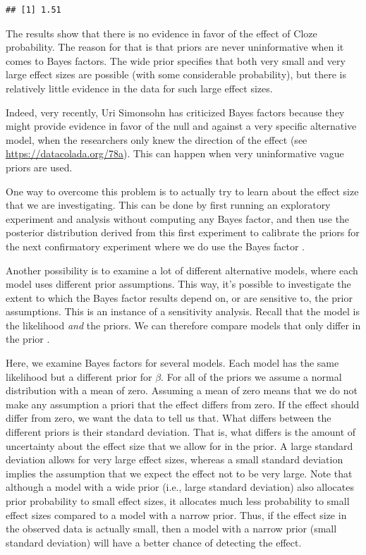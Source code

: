 \documentclass[12pt,]{krantz}
\theoremstyle{definition}
\theoremstyle{definition}
\theoremstyle{definition}
\theoremstyle{remark}
\begin{document}
\begin{verbatim}
## [1] 1.51
\end{verbatim}

The results show that there is no evidence in favor of the effect of Cloze probability. The reason for that is that priors are never uninformative when it comes to Bayes factors. The wide prior specifies that both very small and very large effect sizes are possible (with some considerable probability), but there is relatively little evidence in the data for such large effect sizes.

Indeed, very recently, Uri Simonsohn has criticized Bayes factors because they might provide evidence in favor of the null and against a very specific alternative model, when the researchers only knew the direction of the effect (see \url{https://datacolada.org/78a}). This can happen when very uninformative vague priors are used.

One way to overcome this problem is to actually try to learn about the effect size that we are investigating. This can be done by first running an exploratory experiment and analysis without computing any Bayes factor, and then use the posterior distribution derived from this first experiment to calibrate the priors for the next confirmatory experiment where we do use the Bayes factor \citep[see][ for a Bayes Factor test calibrated to investigate replication success]{verhagenBayesianTestsQuantify2014}.

Another possibility is to examine a lot of different alternative models, where each model uses different prior assumptions. This way, it's possible to investigate the extent to which the Bayes factor results depend on, or are sensitive to, the prior assumptions. This is an instance of a sensitivity analysis. Recall that the model is the likelihood \emph{and} the priors. We can therefore compare models that only differ in the prior \citep[for an example involving EEG and predictability effects, see][]{nicenboim2020words}.

Here, we examine Bayes factors for several models. Each model has the same likelihood but a different prior for \(\beta\). For all of the priors we assume a normal distribution with a mean of zero. Assuming a mean of zero means that we do not make any assumption a priori that the effect differs from zero. If the effect should differ from zero, we want the data to tell us that. What differs between the different priors is their standard deviation. That is, what differs is the amount of uncertainty about the effect size that we allow for in the prior. A large standard deviation allows for very large effect sizes, whereas a small standard deviation implies the assumption that we expect the effect not to be very large. Note that although a model with a wide prior (i.e., large standard deviation) also allocates prior probability to small effect sizes, it allocates much less probability to small effect sizes compared to a model with a narrow prior. Thus, if the effect size in the observed data is actually small, then a model with a narrow prior (small standard deviation) will have a better chance of detecting the effect.
\end{document}
